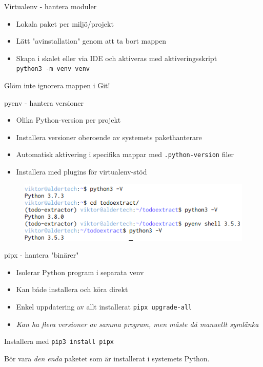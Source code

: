 \begin{frame}{Virtualenv - hantera moduler}
  \begin{itemize}
    \item Lokala paket per miljö/projekt
    \item Lätt "avinstallation" genom att ta bort mappen
    \item Skapa i skalet eller via IDE och aktiveras med aktiveringsskript\\
          \texttt{python3 -m venv venv}\\
  \end{itemize}

  Glöm inte ignorera mappen i Git!
\end{frame}

\begin{frame}{pyenv - hantera versioner}
  \begin{itemize}
    \item Olika Python-version per projekt
    \item Installera versioner oberoende av systemets pakethanterare
    \item Automatisk aktivering i specifika mappar med \texttt{.python-version} filer
    \item Installera med plugins för virtualenv-stöd
  \end{itemize}

  \vfill

  \begin{figure}
    \includegraphics[width=0.8\linewidth,keepaspectratio]{fig/pyenv}
  \end{figure}
\end{frame}

\begin{frame}{pipx - hantera "binärer"}
  \begin{itemize}
    \item Isolerar Python program i separata venv
    \item Kan både installera och köra direkt
    \item Enkel uppdatering av allt installerat \texttt{pipx upgrade-all}
    \item \emph{Kan ha flera versioner av samma program, men måste då manuellt symlänka}
  \end{itemize}

  Installera med \texttt{pip3 install pipx}

  Bör vara \emph{den enda} paketet som är installerat i systemets Python.
\end{frame}
